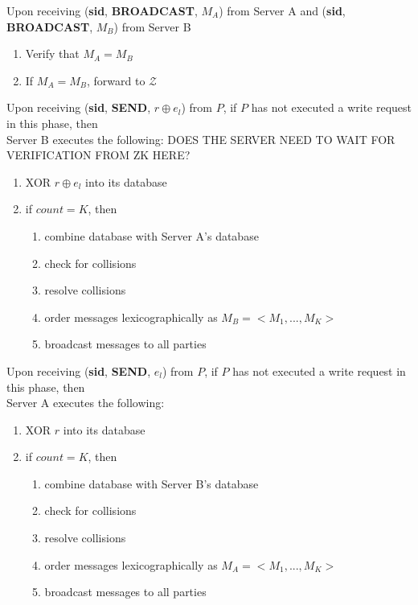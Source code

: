 \begin{tcolorbox}[colback=white, arc=5pt]
\extitem Upon receiving (\textbf{sid}, \textbf{BROADCAST}, $M_A$) from Server A and (\textbf{sid}, \textbf{BROADCAST}, $M_B$) from Server B
\begin{enumerate}
    \item Verify that $M_A = M_B$
    \item If $M_A = M_B$, forward to $\mathcal{Z}$
\end{enumerate}

\extitem Upon receiving (\textbf{sid}, \textbf{SEND}, $r\oplus e_l$) from $P$, if $P$ has not executed a write request in this phase, then \\
    Server B executes the following:
    DOES THE SERVER NEED TO WAIT FOR VERIFICATION FROM ZK HERE?
    \begin{enumerate}
        \item XOR $r\oplus e_l$ into its database  
        \item if $count=K$, then
        \begin{enumerate}
            \item combine database with Server A's database
            \item check for collisions
            \item resolve collisions
            \item order messages lexicographically as $M_B=<M_1,...,M_K>$
            \item broadcast messages to all parties
        \end{enumerate}
    \end{enumerate}

\extitem Upon receiving (\textbf{sid}, \textbf{SEND}, $e_l$) from $P$, if $P$ has not executed a write request in this phase, then \\
    Server A executes the following:
    \begin{enumerate}
        \item XOR $r$ into its database
        \item if $count=K$, then
        \begin{enumerate}
            \item combine database with Server B's database
            \item check for collisions
            \item resolve collisions
            \item order messages lexicographically as $M_A=<M_1,...,M_K>$
            \item broadcast messages to all parties
        \end{enumerate}
    \end{enumerate}
\end{tcolorbox}

\label{fig:riposte_protocol}
